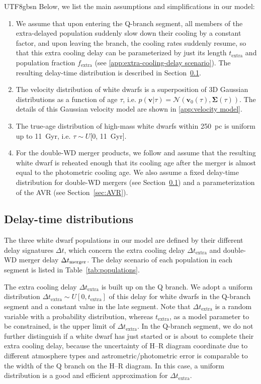 \documentclass[twocolumn, times, trackchanges]{aastex63_bren}
\newcommand{\mathbfit}{\bm}
\begin{document}
\begin{CJK*}{UTF8}{gbsn}
Below, we list the main assumptions and simplifications in our model:
\begin{enumerate}
    \item We assume that upon entering the Q-branch segment, all members of the extra-delayed population suddenly slow down their cooling by a constant factor, and upon leaving the branch, the cooling rates suddenly resume, so that this extra cooling delay can be parameterized by just its length $t_\text{extra}$ and population fraction $f_\text{extra}$ (see \ref{app:extra-cooling-delay scenario}). The resulting delay-time distribution is described in Section~\ref{sec:delay distributions}.
    \item The velocity distribution of white dwarfs is a superposition of 3D Gaussian distributions as a function of age $\tau$, i.e. $p(\mathbfit{v}|\tau)= \mathcal{N}(\mathbf{v}_0(\tau), \mathbf{\Sigma}(\tau))$. The details of this Gaussian velocity model are shown in \ref{app:velocity model}.
    \item The true-age distribution of high-mass white dwarfs within 250~pc is uniform up to 11~Gyr, i.e. $\tau\sim U$[0, 11~Gyr].
    \item For the double-WD merger products, we follow \citet{Wegg_2012} and assume that the resulting white dwarf is reheated enough that its cooling age after the merger is almost equal to the photometric cooling age. We also assume a fixed delay-time distribution for double-WD mergers (see Section~\ref{sec:delay distributions}) and a parameterization of the AVR (see Section~\ref{sec:AVR}).
\end{enumerate}


\subsection{Delay-time distributions}
\label{sec:delay distributions}

The three white dwarf populations in our model are defined by their different delay signatures $\Delta t$, which concern the extra cooling delay $\Delta t_\text{extra}$ and double-WD merger delay $\Delta t_{\rm merger}$. The delay scenario of each population in each segment is listed in Table~\ref{tab:populations}.

The extra cooling delay $\Delta t_\text{extra}$ is built up on the Q branch. We adopt a uniform distribution $\Delta t_\text{extra}\sim U[0,t_\text{extra}]$ of this delay for white dwarfs in the Q-branch segment and a constant value in the late segment. Note that $\Delta t_\text{extra}$ is a random variable with a probability distribution, whereas $t_\text{extra}$, as a model parameter to be constrained, is the upper limit of $\Delta t_\text{extra}$.
In the Q-branch segment, we do not further distinguish if a white dwarf has just started or is about to complete their extra cooling delay, because the uncertainty of H--R diagram coordinate due to different atmosphere types and astrometric/photometric error is comparable to the width of the Q branch on the H--R diagram. In this case, a uniform distribution is a good and efficient approximation for $\Delta t_\text{extra}$.


\end{CJK*}
\end{document}
